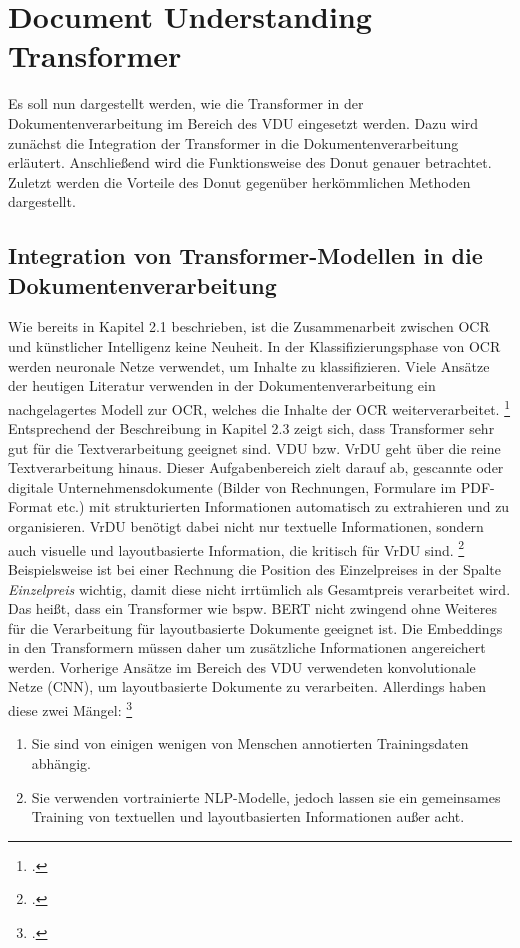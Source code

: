 \section{Document Understanding Transformer}
Es soll nun dargestellt werden, wie die Transformer in der Dokumentenverarbeitung im Bereich des \ac{VDU} eingesetzt werden. Dazu wird zunächst die Integration der Transformer in die Dokumentenverarbeitung erläutert. Anschließend wird die Funktionsweise des \ac{Donut} genauer betrachtet. Zuletzt werden die Vorteile des \ac{Donut} gegenüber herkömmlichen Methoden dargestellt.

\subsection{Integration von Transformer-Modellen in die Dokumentenverarbeitung}
Wie bereits in Kapitel 2.1 beschrieben, ist die Zusammenarbeit zwischen OCR und künstlicher Intelligenz keine Neuheit. In der Klassifizierungsphase von OCR werden neuronale Netze verwendet, um Inhalte zu klassifizieren. Viele Ansätze der heutigen Literatur verwenden in der Dokumentenverarbeitung ein nachgelagertes Modell zur OCR, welches die Inhalte der OCR weiterverarbeitet. \footcites[Vgl.][]{hwang_post-ocr_2019,xu_layoutlm_2020,hwang_spatial_2021} Entsprechend der Beschreibung in Kapitel 2.3 zeigt sich, dass Transformer sehr gut für die Textverarbeitung geeignet sind. \ac{VDU} bzw. \ac{VrDU} geht über die reine Textverarbeitung hinaus. Dieser Aufgabenbereich zielt darauf ab, gescannte oder digitale Unternehmensdokumente (Bilder von Rechnungen, Formulare im PDF-Format etc.) mit strukturierten Informationen automatisch zu extrahieren und zu organisieren. \ac{VrDU} benötigt dabei nicht nur textuelle Informationen, sondern auch visuelle und layoutbasierte Information, die kritisch für \ac{VrDU} sind. \footcites[Vgl.][S. 1192]{xu_layoutlmv2_2022} Beispielsweise ist bei einer Rechnung die Position des Einzelpreises in der Spalte \emph{Einzelpreis} wichtig, damit diese nicht irrtümlich als Gesamtpreis verarbeitet wird. Das heißt, dass ein Transformer wie bspw. BERT nicht zwingend ohne Weiteres für die Verarbeitung für layoutbasierte Dokumente geeignet ist. Die Embeddings in den Transformern müssen daher um zusätzliche Informationen angereichert werden. Vorherige Ansätze im Bereich des \ac{VDU} verwendeten konvolutionale Netze (\ac{CNN}), um layoutbasierte Dokumente zu verarbeiten. Allerdings haben diese zwei Mängel: \footcites[Vgl.][S. 1193]{xu_layoutlm_2020}
\begin{enumerate}[1.]
    \item Sie sind von einigen wenigen von Menschen annotierten Trainingsdaten abhängig.
    \item Sie verwenden vortrainierte NLP-Modelle, jedoch lassen sie ein gemeinsames Training von textuellen und layoutbasierten Informationen außer acht.
\end{enumerate}
